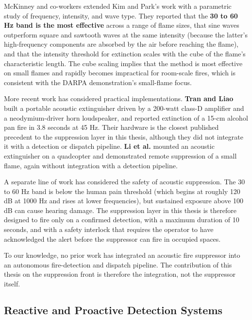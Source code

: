 McKinney and co-workers \cite{mckinney2019sonic} extended Kim and Park's work with a parametric study of frequency, intensity, and wave type. They reported that the \textbf{30 to 60 Hz band is the most effective} across a range of flame sizes, that sine waves outperform square and sawtooth waves at the same intensity (because the latter's high-frequency components are absorbed by the air before reaching the flame), and that the intensity threshold for extinction scales with the cube of the flame's characteristic length. The cube scaling implies that the method is most effective on small flames and rapidly becomes impractical for room-scale fires, which is consistent with the DARPA demonstration's small-flame focus.

More recent work has considered practical implementations. \textbf{Tran and Liao} \cite{tran2021portable} built a portable acoustic extinguisher driven by a 200-watt class-D amplifier and a neodymium-driver horn loudspeaker, and reported extinction of a 15-cm alcohol pan fire in 3.8 seconds at 45 Hz. Their hardware is the closest published precedent to the suppression layer in this thesis, although they did not integrate it with a detection or dispatch pipeline. \textbf{Li et al.} \cite{li2022drone} mounted an acoustic extinguisher on a quadcopter and demonstrated remote suppression of a small flame, again without integration with a detection pipeline.

A separate line of work has considered the safety of acoustic suppression. The 30 to 60 Hz band is below the human pain threshold (which begins at roughly 120 dB at 1000 Hz and rises at lower frequencies), but sustained exposure above 100 dB can cause hearing damage. The suppression layer in this thesis is therefore designed to fire only on a confirmed detection, with a maximum duration of 10 seconds, and with a safety interlock that requires the operator to have acknowledged the alert before the suppressor can fire in occupied spaces.

To our knowledge, no prior work has integrated an acoustic fire suppressor into an autonomous fire-detection and dispatch pipeline. The contribution of this thesis on the suppression front is therefore the integration, not the suppressor itself.

\subsection{Reactive and Proactive Detection Systems}

